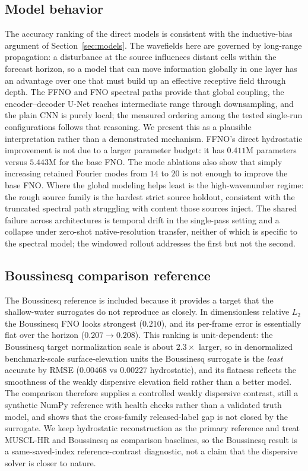 \subsection{Model behavior}
The accuracy ranking of the direct models is consistent with the inductive-bias argument of Section~\ref{sec:models}. The wavefields here are governed by long-range propagation: a disturbance at the source influences distant cells within the forecast horizon, so a model that can move information globally in one layer has an advantage over one that must build up an effective receptive field through depth. The FFNO and FNO spectral paths provide that global coupling, the encoder--decoder U-Net reaches intermediate range through downsampling, and the plain CNN is purely local; the measured ordering among the tested single-run configurations follows that reasoning. We present this as a plausible interpretation rather than a demonstrated mechanism. FFNO's direct hydrostatic improvement is not due to a larger parameter budget: it has $0.411$M parameters versus $5.443$M for the base FNO. The mode ablations also show that simply increasing retained Fourier modes from $14$ to $20$ is not enough to improve the base FNO. Where the global modeling helps least is the high-wavenumber regime: the rough source family is the hardest strict source holdout, consistent with the truncated spectral path struggling with content those sources inject. The shared failure across architectures is temporal drift in the single-pass setting and a collapse under zero-shot native-resolution transfer, neither of which is specific to the spectral model; the windowed rollout addresses the first but not the second.

\subsection{Boussinesq comparison reference}
The Boussinesq reference is included because it provides a target that the shallow-water surrogates do not reproduce as closely. In dimensionless relative $L_2$ the Boussinesq FNO looks strongest ($0.210$), and its per-frame error is essentially flat over the horizon ($0.207 \to 0.208$). This ranking is unit-dependent: the Boussinesq target normalization scale is about $2.3 \times$ larger, so in denormalized benchmark-scale surface-elevation units the Boussinesq surrogate is the \emph{least} accurate by RMSE ($0.00468$ vs $0.00227$ hydrostatic), and its flatness reflects the smoothness of the weakly dispersive elevation field rather than a better model. The comparison therefore supplies a controlled weakly dispersive contrast, still a synthetic NumPy reference with health checks rather than a validated truth model, and shows that the cross-family released-label gap is not closed by the surrogate. We keep hydrostatic reconstruction as the primary reference and treat MUSCL-HR and Boussinesq as comparison baselines, so the Boussinesq result is a same-saved-index reference-contrast diagnostic, not a claim that the dispersive solver is closer to nature.

